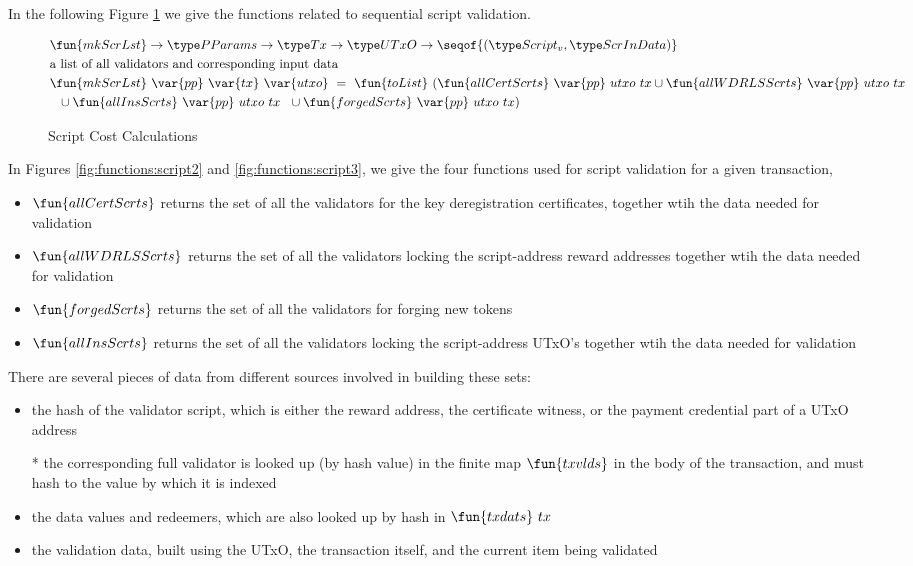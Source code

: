 \clearpage

In the following Figure \ref{fig:functions:script1} we give the functions
related to sequential script validation.

\begin{figure}[htb]
  \begin{align*}
    & \fun{mkScrLst} \to \PParams \to \Tx \to \UTxO \to \seqof{(\ScriptV,\ScrInData)} \\
    & \text{a list of all validators and corresponding input data} \\
    & \fun{mkScrLst}  ~\var{pp}~\var{tx}~ \var{utxo} ~=~
    \fun{toList}~(\fun{allCertScrts}~\var{pp}~{utxo}~{tx} \cup \fun{allWDRLSScrts}~\var{pp}~{utxo}~{tx} \\
    & ~~ \cup \fun{allInsScrts}~\var{pp}~{utxo}~{tx} ~~ \cup \fun{forgedScrts}~\var{pp}~{utxo}~{tx}) \\
  \end{align*}
  \caption{Script Cost Calculations}
  \label{fig:functions:script1}
\end{figure}

In Figures \ref{fig:functions:script2} and \ref{fig:functions:script3},
we give the four functions
used for script validation for a given transaction,

\begin{itemize}
\item $\fun{allCertScrts}$ returns the set of all the validators for the
key deregistration certificates, together
wtih the data needed for validation
\item $\fun{allWDRLSScrts}$ returns the set of all the validators locking
the script-address reward addresses together
wtih the data needed for validation
\item $\fun{forgedScrts}$ returns the set of all the validators for
forging new tokens
\item $\fun{allInsScrts}$ returns the set of all the validators locking
the script-address UTxO's together
wtih the data needed for validation
\end{itemize}

There are several pieces of data from different sources involved in building these
sets:

\begin{itemize}
\item the hash of the validator script, which is either the reward address,
the certificate witness, or the payment credential part of a UTxO address

* the corresponding
full validator is looked up (by hash value) in the finite map $\fun{txvlds}$ in the
body of the transaction, and must hash to the value by which it is indexed

\item the data values and redeemers, which are also looked up by hash in $\fun{txdats}~{tx}$

\item the validation data, built using the UTxO, the transaction itself,
and the current item being validated
\end{itemize}

